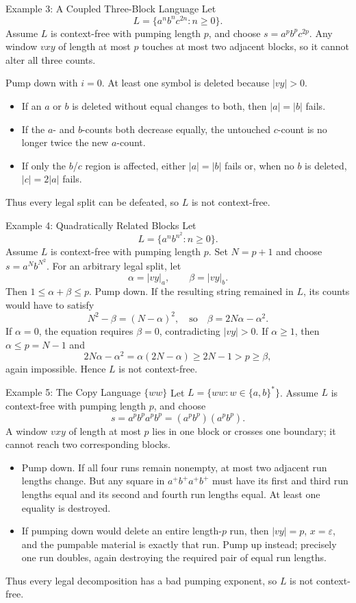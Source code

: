 \documentclass[10pt]{beamer}
\begin{document}
\begin{frame}{Example 3: A Coupled Three-Block Language}
  \small
  Let
  \[
    L=\{a^n b^n c^{2n}:n\ge0\}.
  \]
  Assume $L$ is context-free with pumping length $p$, and choose
  $s=a^p b^p c^{2p}$. Any window $vxy$ of length at most $p$ touches at most
  two adjacent blocks, so it cannot alter all three counts.

  Pump down with $i=0$. At least one symbol is deleted because $|vy|>0$.
  \begin{itemize}
    \item If an $a$ or $b$ is deleted without equal changes to both, then
      $|a|=|b|$ fails.
    \item If the $a$- and $b$-counts both decrease equally, the untouched
      $c$-count is no longer twice the new $a$-count.
    \item If only the $b$/$c$ region is affected, either $|a|=|b|$ fails or,
      when no $b$ is deleted, $|c|=2|a|$ fails.
  \end{itemize}
  Thus every legal split can be defeated, so $L$ is not context-free.
\end{frame}

\begin{frame}{Example 4: Quadratically Related Blocks}
  \small
  Let
  \[
    L=\{a^n b^{n^2}:n\ge0\}.
  \]
  Assume $L$ is context-free with pumping length $p$. Set $N=p+1$ and choose
  $s=a^N b^{N^2}$. For an arbitrary legal split, let
  \[
    \alpha=|vy|_a,\qquad \beta=|vy|_b.
  \]
  Then $1\le\alpha+\beta\le p$. Pump down. If the resulting string remained
  in $L$, its counts would have to satisfy
  \[
    N^2-\beta=(N-\alpha)^2,
    \quad\text{so}\quad
    \beta=2N\alpha-\alpha^2.
  \]
  If $\alpha=0$, the equation requires $\beta=0$, contradicting
  $|vy|>0$. If $\alpha\ge1$, then $\alpha\le p=N-1$ and
  \[
    2N\alpha-\alpha^2=\alpha(2N-\alpha)\ge2N-1>p\ge\beta,
  \]
  again impossible. Hence $L$ is not context-free.
\end{frame}

\begin{frame}{Example 5: The Copy Language $\{ww\}$}
  \small
  Let $L=\{ww:w\in\{a,b\}^*\}$. Assume $L$ is context-free with pumping
  length $p$, and choose
  \[
    s=a^pb^pa^pb^p=(a^pb^p)(a^pb^p).
  \]
  A window $vxy$ of length at most $p$ lies in one block or crosses one
  boundary; it cannot reach two corresponding blocks.
  \begin{itemize}
    \item Pump down. If all four runs remain nonempty, at most two adjacent
      run lengths change. But any square in $a^+b^+a^+b^+$ must have its first
      and third run lengths equal and its second and fourth run lengths equal.
      At least one equality is destroyed.
    \item If pumping down would delete an entire length-$p$ run, then
      $|vy|=p$, $x=\varepsilon$, and the pumpable material is exactly that
      run. Pump up instead; precisely one run doubles, again destroying the
      required pair of equal run lengths.
  \end{itemize}
  Thus every legal decomposition has a bad pumping exponent, so $L$ is not
  context-free.
\end{frame}
\end{document}
